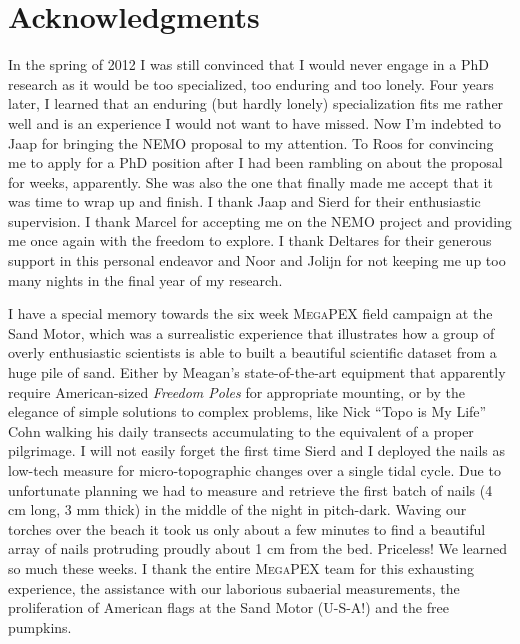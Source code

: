 \chapter*{Acknowledgments}

In the spring of 2012 I was still convinced that I would never engage
in a PhD research as it would be too specialized, too enduring and too
lonely. Four years later, I learned that an enduring (but hardly
lonely) specialization fits me rather well and is an experience I
would not want to have missed. Now I'm indebted to Jaap for bringing
the NEMO proposal to my attention. To Roos for convincing me to apply
for a PhD position after I had been rambling on about the proposal for
weeks, apparently. She was also the one that finally made me accept
that it was time to wrap up and finish. I thank Jaap and Sierd for
their enthusiastic supervision. I thank Marcel for accepting me on the
NEMO project and providing me once again with the freedom to
explore. I thank Deltares for their generous support in this personal
endeavor and Noor and Jolijn for not keeping me up too many nights in
the final year of my research.

I have a special memory towards the six week \textsc{MegaPEX} field
campaign at the Sand Motor, which was a surrealistic experience that
illustrates how a group of overly enthusiastic scientists is able to
built a beautiful scientific dataset from a huge pile of sand. Either
by Meagan's state-of-the-art equipment that apparently require
American-sized \emph{Freedom Poles} for appropriate mounting, or by
the elegance of simple solutions to complex problems, like Nick ``Topo
is My Life'' Cohn walking his daily transects accumulating to the
equivalent of a proper pilgrimage. I will not easily forget the first
time Sierd and I deployed the nails as low-tech measure for
micro-topographic changes over a single tidal cycle. Due to
unfortunate planning we had to measure and retrieve the first batch of
nails (4 cm long, 3 mm thick) in the middle of the night in
pitch-dark. Waving our torches over the beach it took us only about a
few minutes to find a beautiful array of nails protruding proudly
about 1 cm from the bed. Priceless!  We learned so much these weeks. I
thank the entire \textsc{MegaPEX} team for this exhausting experience,
the assistance with our laborious subaerial measurements, the
proliferation of American flags at the Sand Motor (U-S-A!) and the
free pumpkins.

